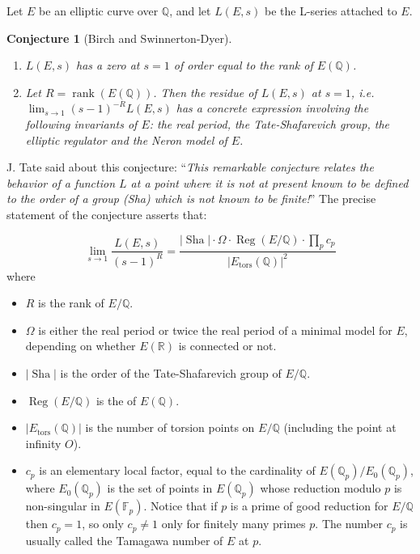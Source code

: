 \documentclass[12pt]{article}
\newtheorem{conj}{Conjecture}
\newcommand{\Q}{\mathbb{Q}}
\begin{document}
Let $E$ be an elliptic curve over $\mathbb{Q}$, and let $L(E,s)$
be the L-series attached to $E$.

\begin{conj}[Birch and Swinnerton-Dyer]\quad
\begin{enumerate}
\item $L(E,s)$ has a zero at $s=1$ of order equal to the rank of
$E(\mathbb{Q})$.

\item Let $R=\operatorname{rank} (E(\mathbb{Q}))$. Then the residue of $L(E,s)$ at
$s=1$, i.e. $\lim_{s\to 1}(s-1)^{-R} L(E,s)$ has a concrete
expression involving the following invariants of $E$: the real
period, the Tate-Shafarevich group, the elliptic regulator and the
Neron model of $E$.
\end{enumerate}
\end{conj}

J. Tate said about this conjecture: ``\emph{This remarkable conjecture relates the behavior of a function $L$ at a point where it is not at present known to be defined to the order of a group (Sha) which is not known to be finite!}'' The precise statement of the conjecture asserts that:

$$\lim_{s\to 1} \frac{L(E,s)}{(s-1)^R}=\frac{|\operatorname{Sha}|\cdot \Omega \cdot \operatorname{Reg}(E/\Q) \cdot \prod_p c_p}{| E_{\operatorname{tors}}(\Q)|^2}$$ 
where
\begin{itemize}
\item $R$ is the rank of $E/\Q$.
\item $\Omega$ is either the real period or twice the real period of a minimal model for $E$, depending on whether $E(\mathbb{R})$ is connected or not.
\item $|\operatorname{Sha}|$ is the order of the Tate-Shafarevich group of $E/\Q$.
\item $\operatorname{Reg}(E/\Q)$ is the  of $E(\Q)$.
\item $|E_{\operatorname{tors}}(\Q)|$ is the number of torsion points on $E/\Q$ (including the point at infinity $O$).
\item $c_p$ is an elementary local factor, equal to the cardinality of $E(\Q_p)/E_0(\Q_p)$, where $E_0(\Q_p)$ is the set of points in $E(\Q_p)$ whose reduction modulo $p$ is non-singular in $E(\mathbb{F}_p)$. Notice that if $p$ is a prime of good reduction for $E/\Q$ then $c_p=1$, so only $c_p\neq 1$ only for finitely many primes $p$. The number $c_p$ is usually called the Tamagawa number of $E$ at $p$.
\end{itemize}
\end{document}
